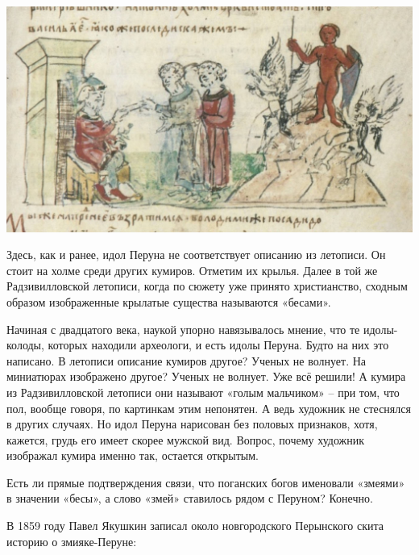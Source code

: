 \begin{center}
\includegraphics[width=\linewidth]{chast-zmiy/ktotakiezmei/rad-perun-03.jpg}
\end{center}

Здесь, как и ранее, идол Перуна не соответствует описанию из летописи. Он стоит на холме среди других кумиров. Отметим их крылья. Далее в той же Радзивилловской летописи, когда по сюжету уже принято христианство, сходным образом изображенные крылатые существа называются «бесами».

Начиная с двадцатого века, наукой упорно навязывалось мнение, что те идолы-колоды, которых находили археологи, и есть идолы Перуна. Будто на них это написано. В летописи описание кумиров другое? Ученых не волнует. На миниатюрах изображено другое? Ученых не волнует. Уже всё решили! А кумира из Радзивилловской летописи они называют «голым мальчиком» – при том, что пол, вообще говоря, по картинкам этим непонятен. А ведь художник не стеснялся в других случаях. Но идол Перуна нарисован без половых признаков, хотя, кажется, грудь его имеет скорее мужской вид. Вопрос, почему художник изображал кумира именно так, остается открытым.

Есть ли прямые подтверждения связи, что поганских богов именовали «змеями» в значении «бесы», а слово «змей» ставилось рядом с Перуном? Конечно.

В 1859 году Павел Якушкин записал\cite[стр. 118]{yakushin01} около новгородского Перынского скита историю о змияке-Перуне:

